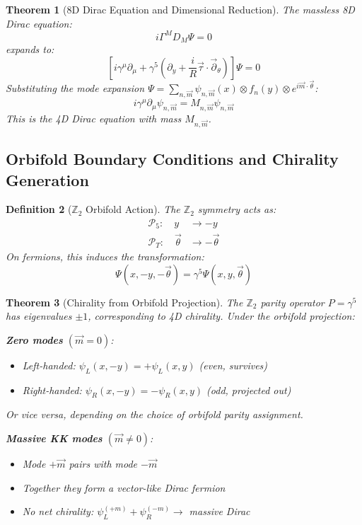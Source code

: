 \documentclass[12pt,a4paper]{article}
\newtheorem{theorem}{Theorem}[section]
\newtheorem{definition}[theorem]{Definition}
\begin{document}
\begin{theorem}[8D Dirac Equation and Dimensional Reduction]
The massless 8D Dirac equation:
\begin{equation}
i\Gamma^M D_M \Psi = 0
\end{equation}
expands to:
\begin{equation}
\left[i\gamma^\mu\partial_\mu + \gamma^5\left(\partial_y + \frac{i}{R}\vec{\tau}\cdot\vec{\partial}_\theta\right)\right]\Psi = 0
\end{equation}
Substituting the mode expansion $\Psi = \sum_{n,\vec{m}} \psi_{n,\vec{m}}(x) \otimes f_n(y) \otimes e^{i\vec{m}\cdot\vec{\theta}}$:
\begin{equation}
\boxed{i\gamma^\mu\partial_\mu \psi_{n,\vec{m}} = M_{n,\vec{m}}\psi_{n,\vec{m}}}
\end{equation}
This is the 4D Dirac equation with mass $M_{n,\vec{m}}$.
\end{theorem}

\subsection{Orbifold Boundary Conditions and Chirality Generation}

\begin{definition}[$\mathbb{Z}_2$ Orbifold Action]
The $\mathbb{Z}_2$ symmetry acts as:
\begin{align}
\mathcal{P}_5: \quad y &\to -y \\
\mathcal{P}_T: \quad \vec{\theta} &\to -\vec{\theta}
\end{align}
On fermions, this induces the transformation:
\begin{equation}
\Psi(x, -y, -\vec{\theta}) = \gamma^5 \Psi(x, y, \vec{\theta})
\end{equation}
\end{definition}

\begin{theorem}[Chirality from Orbifold Projection]
The $\mathbb{Z}_2$ parity operator $P = \gamma^5$ has eigenvalues $\pm 1$, corresponding to 4D chirality. Under the orbifold projection:

\textbf{Zero modes} $(\vec{m} = 0)$:
\begin{itemize}
    \item Left-handed: $\psi_L(x,-y) = +\psi_L(x,y)$ (even, survives)
    \item Right-handed: $\psi_R(x,-y) = -\psi_R(x,y)$ (odd, projected out)
\end{itemize}
Or vice versa, depending on the choice of orbifold parity assignment.

\textbf{Massive KK modes} $(\vec{m} \neq 0)$:
\begin{itemize}
    \item Mode $+\vec{m}$ pairs with mode $-\vec{m}$
    \item Together they form a \textit{vector-like} Dirac fermion
    \item No net chirality: $\psi_L^{(+m)} + \psi_R^{(-m)} \to$ massive Dirac
\end{itemize}
\end{theorem}
\end{document}
